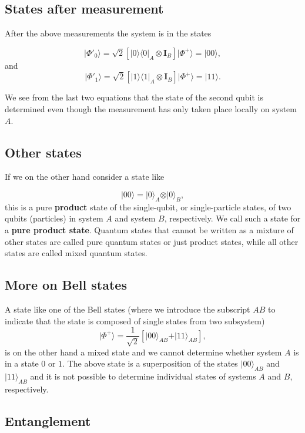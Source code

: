 \documentclass[%
oneside,                 %
final,                   %
10pt]{article}
\begin{document}
\subsection{States after measurement}
After the above measurements the system is in the states

\[
\vert \Phi'_0 \rangle = \sqrt{2}\left[\vert 0\rangle\langle 0\vert_A\otimes \bm{I}_B\right]\vert\Phi^+\rangle=\vert 00\rangle,
\]
and 
\[
\vert \Phi'_1 \rangle = \sqrt{2}\left[\vert 1\rangle\langle 1\vert_A\otimes \bm{I}_B\right]\vert\Phi^+\rangle=\vert 11\rangle.
\]

We see from the last two equations that the state of the second qubit
is determined even though the measurement has only taken place locally
on system $A$.

\subsection{Other states}

If we on the other hand consider a state like

\[
\vert 00 \rangle = \vert 0\rangle_A\otimes \vert 0\rangle_B,
\]
this is a pure \textbf{product} state of the single-qubit, or single-particle
states, of two qubits (particles) in system $A$ and system $B$,
respectively. We call such a state for a \textbf{pure product state}.  Quantum states
that cannot be written as a mixture of other states are called pure
quantum states or just product states, while all other states are called mixed quantum states.

\subsection{More on Bell states}
A state like one of the Bell states (where we introduce the subscript $AB$ to indicate that the state is composed of single states from two subsystem)
\[
\vert \Phi^+\rangle = \frac{1}{\sqrt{2}}\left[\vert 00\rangle_{AB} +\vert 11\rangle_{AB}\right],
\]
is on the other hand a mixed state and we cannot determine whether system $A$ is in a state $0$ or $1$. The above state is a superposition of the states $\vert 00\rangle_{AB}$ and $\vert 11\rangle_{AB}$ and it is not possible to determine individual states of systems $A$ and $B$, respectively.

\subsection{Entanglement}
\end{document}
